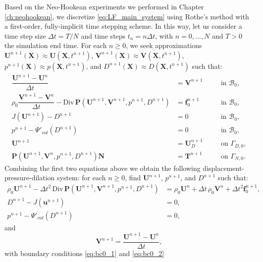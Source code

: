 \documentclass{sfuthesis}
\numberwithin{equation}{section}
\numberwithin{figure}{chapter}
\numberwithin{table}{chapter}
\theoremstyle{definition}
\def\*#1{{\mathbf{#1}}} %
\newcommand{\Divt}[1]{{\bm{\mathrm{Div}} \, #1}}
\newcommand{\B}{\mathcal{B}}
\begin{document}
Based on the Neo-Hookean experiments we performed in Chapter \ref{ch:neohookean}, we discretize \eqref{eq:LF_main_system} using Rothe's method with a first-order, fully-implicit time stepping scheme. In this way, let us consider a time step size $\Delta t = T/N$ and time steps $t_n = n \Delta t$, with $n=0,\dots,N$ and $T > 0$ the simulation end time. For each $n \geq 0$, we seek approximations $\*U^{n+1}(\*X) \approx \*U(\*X,t^{n+1})$, $\*V^{n+1}(\*X) \approx \*V(\*X,t^{n+1})$, $p^{n+1}(\*X) \approx p(\*X,t^{n+1})$, and $D^{n+1}(\*X) \approx D(\*X,t^{n+1})$ such that:
\begin{subequations}
    \begin{align}
    \dfrac{\*U^{n+1} - \*U^n}{\Delta t} &= \*V^{n+1} \quad &&\text{in } \B_0, \\
    \rho_0 \dfrac{\*V^{n+1} - \*V^n}{\Delta t} - \Divt{\*P(\*U^{n+1}, \*V^{n+1}, p^{n+1}, D^{n+1})} &= \*f_0^{n+1} \quad &&\text{in } \B_0, \\
    J(\*U^{n+1}) - D^{n+1} &= 0 \quad &&\text{in } \B_0, \\
    p^{n+1}-\Psi'_{vol}(D^{n+1}) &= 0 \quad &&\text {in } \B_0, \\
    \label{eq:bc0_1} \*U^{n+1} &= \*U_D^{n+1} \quad &&\text{on } \Gamma_{D,0}, \\
    \label{eq:bc0_2} \*P(\*U^{n+1},\*V^n,p^{n+1},D^{n+1}) \*N &= \*T^{n+1} \quad &&\text{on }\Gamma_{N,0}.
    \end{align}
\end{subequations}
Combining the first two equations above we obtain the following displacement-pressure-dilation system: for each $n \geq 0$, find $\*U^{n+1}$, $p^{n+1}$, and $D^{n+1}$ such that:
\begin{subequations}\label{eq:LF_time}
    \begin{align}
    \label{eq:LF_time_1}\rho_0 \*U^{n+1} - \Delta t^2 \, \Divt{\*P(\*U^{n+1}, \*V^{n+1}, p^{n+1}, D^{n+1})} &= \rho_0 \*U^n + \Delta t \, \rho_0 \*V^n + \Delta t^2 \*f_0^{n+1}, \\
    \label{eq:LF_time_2}D^{n+1}-J(\*u^{n+1}) &= 0 , \\
    \label{eq:LF_time_3}p^{n+1}-\Psi'_{vol}(D^{n+1}) &= 0,
    \end{align}
\end{subequations}
and
\begin{equation}
    \*V^{n+1} = \dfrac{\*U^{n+1} - \*U^n}{\Delta t},
\end{equation}
with boundary conditions \eqref{eq:bc0_1} and \eqref{eq:bc0_2} 
\end{document}
